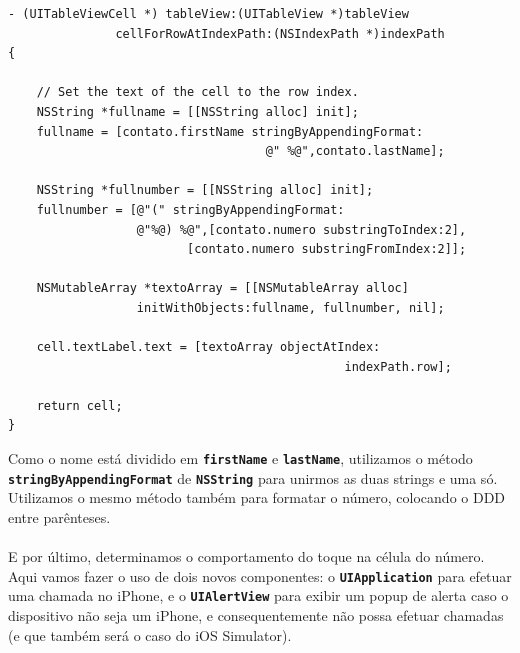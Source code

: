 \documentclass[a4paper,12pt,brazil,doubleside]{book}
\begin{document}
\begin{listing}
\begin{verbatim}
- (UITableViewCell *) tableView:(UITableView *)tableView
               cellForRowAtIndexPath:(NSIndexPath *)indexPath
{
    
    // Set the text of the cell to the row index.
    NSString *fullname = [[NSString alloc] init];
    fullname = [contato.firstName stringByAppendingFormat:
                                    @" %@",contato.lastName];
    
    NSString *fullnumber = [[NSString alloc] init];
    fullnumber = [@"(" stringByAppendingFormat:
                  @"%@) %@",[contato.numero substringToIndex:2],
                         [contato.numero substringFromIndex:2]];
    
    NSMutableArray *textoArray = [[NSMutableArray alloc]
                  initWithObjects:fullname, fullnumber, nil];

    cell.textLabel.text = [textoArray objectAtIndex:
                                               indexPath.row];
    
    return cell;
}
\end{verbatim}
\end{listing}

Como o nome está dividido em \texttt{\textbf{firstName}} e \texttt{\textbf{lastName}}, utilizamos o método\\
\texttt{\textbf{stringByAppendingFormat}} de \texttt{\textbf{NSString}} para unirmos as duas strings e uma só. Utilizamos o mesmo método também para formatar o número, colocando o DDD entre parênteses.
\paragraph{}E por último, determinamos o comportamento do toque na célula do número. Aqui vamos fazer o uso de dois novos componentes: o \texttt{\textbf{UIApplication}} para efetuar uma chamada no iPhone, e o \texttt{\textbf{UIAlertView}} para exibir um popup de alerta caso o dispositivo não seja um iPhone, e consequentemente não possa efetuar chamadas (e que também será o caso do iOS Simulator).

\pagebreak
\end{document}
